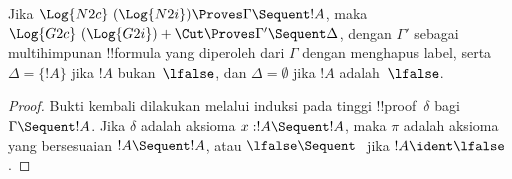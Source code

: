 \documentclass[../../../include/open-logic-section]{subfiles}
\begin{document}


\begin{prop} Jika $\Log{N2c}\ (\Log{N2i}) \Proves
\Gamma \Sequent !A$, maka $\Log{G2c}\ (\Log{G2i}) + \Cut \Proves \Gamma'
\Sequent \Delta$, dengan $\Gamma'$ sebagai multihimpunan !!{formula} yang
diperoleh dari $\Gamma$ dengan menghapus label, serta $\Delta = \{!A\}$ jika
$!A$ bukan~$\lfalse$, dan $\Delta = \emptyset$ jika $!A$ adalah~$\lfalse$.
\end{prop}

\begin{proof}
Bukti kembali dilakukan melalui induksi pada tinggi
!!{proof}~$\delta$ bagi $\Gamma \Sequent !A$. Jika $\delta$ adalah aksioma
$x:!A \Sequent !A$, maka $\pi$ adalah aksioma yang bersesuaian
$!A \Sequent !A$, atau $\lfalse \Sequent \ $ jika
$!A \ident \lfalse$.


\end{proof}
\end{document}

